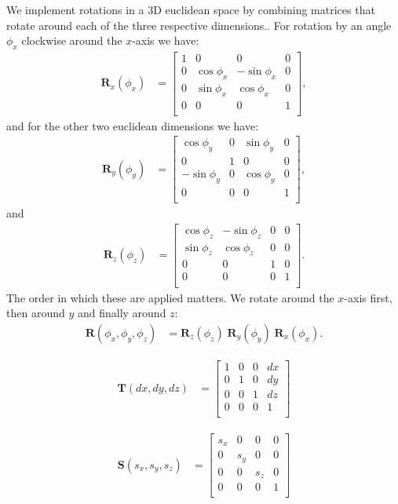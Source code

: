 \documentclass[12pt,journal,draftclsnofoot,onecolumn]{IEEEtran}
\newcommand\bmat[1]{\begin{bmatrix}#1\end{bmatrix}}
\newcommand\mat[1]{\boldsymbol{#1}}
\newcommand\1{\vec 1}
\newcommand*\R{\mat R}
\begin{document}
We implement rotations in a 3D euclidean space by combining matrices that rotate around each of the three respective dimensions.. For rotation by an angle $\phi_x$ clockwise around the $x$-axis we have:
\begin{align}
\R_x(\phi_x) &= \bmat{
1  &  0           &  0           &  0 \\
0  &  \cos\phi_x  &  -\sin\phi_x &  0 \\
0  &  \sin\phi_x  &  \cos\phi_x  &  0 \\
0  &  0           &  0           &  1 \\
},
\end{align}
and for the other two euclidean dimensions we have:
\begin{align}
\R_y(\phi_y) &= \bmat{
\cos\phi_y  &  0  &  \sin\phi_y  &  0 \\
0           &  1  &  0           &  0 \\
-\sin\phi_y &  0  &  \cos\phi_y  &  0 \\
0           &  0  &  0           &  1 \\
},
\end{align}
and
\begin{align}
\R_z(\phi_z) &= \bmat{
\cos\phi_z  &  -\sin\phi_z &  0  &  0 \\
\sin\phi_z  &  \cos\phi_z  &  0  &  0 \\
0           &  0           &  1  &  0 \\
0           &  0           &  0  &  1 \\
}.
\end{align}
The order in which these are applied matters. We rotate around the $x$-axis first, then around $y$ and finally around $z$:
\begin{align}
\R(\phi_x, \phi_y, \phi_z) &= \R_z(\phi_z)\;\R_y(\phi_y)\;\R_x(\phi_x).
\end{align}

\begin{align}
\boldsymbol{T}(dx,dy,dz) &= \bmat{
1  &  0  &  0  &  dx \\
0  &  1  &  0  &  dy \\
0  &  0  &  1  &  dz \\
0  &  0  &  0  &  1 \\
}
\end{align}

\begin{align}
\boldsymbol{S}(s_x,s_y,s_z) &= \bmat{
s_x  &  0    &  0    &  0 \\
0    &  s_y  &  0    &  0 \\
0    &  0    &  s_z  &  0 \\
0    &  0    &  0    &  1 \\
}
\end{align}
\end{document}
